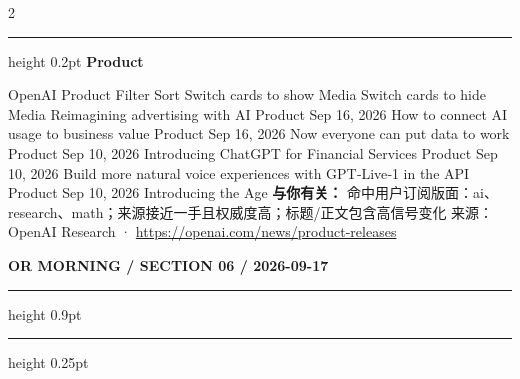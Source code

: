 \documentclass[10.5pt]{ctexart}
\begin{document}
\begin{multicols}{2}
\vspace{2mm}
\hrule height 0.2pt
\vspace{2mm}
{\large\bfseries Product}\par
OpenAI Product Filter Sort Switch cards to show Media Switch cards to hide Media Reimagining advertising with AI Product Sep 16, 2026 How to connect AI usage to business value Product Sep 16, 2026 Now everyone can put data to work Product Sep 10, 2026 Introducing ChatGPT for Financial Services Product Sep 10, 2026 Build more natural voice experiences with GPT‑Live‑1 in the API Product Sep 10, 2026 Introducing the Age
\textbf{与你有关：} 命中用户订阅版面：ai、research、math；来源接近一手且权威度高；标题/正文包含高信号变化
{\footnotesize\color{ormuted} 来源：OpenAI Research · \url{https://openai.com/news/product-releases}}
\end{multicols}
\newpage
{\small\bfseries OR MORNING / SECTION 06 / 2026-09-17}
\vspace{2mm}
\hrule height 0.9pt
\vspace{1.5mm}
\hrule height 0.25pt
\vspace{4mm}
\end{document}
